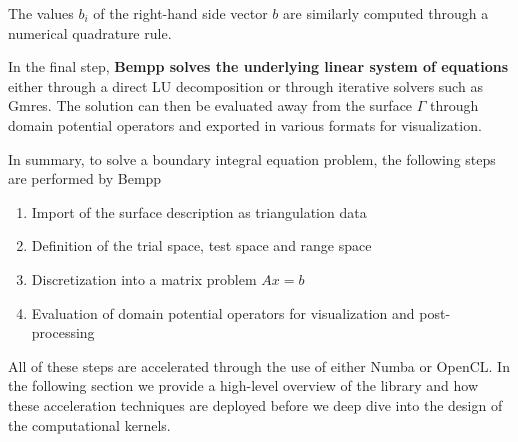 The values $b_i$ of the right-hand side vector $b$ are similarly computed through a numerical quadrature rule.

In the final step, \textbf{Bempp solves the underlying linear system of equations} either through a direct LU decomposition or through iterative solvers such as Gmres. The solution can then be evaluated away from the surface $\Gamma$ through domain potential operators and exported in various formats for visualization.

In summary, to solve a boundary integral equation problem, the following steps are performed by Bempp
\begin{enumerate}
	\item Import of the surface description as triangulation data
	\item Definition of the trial space, test space and range space
	\item Discretization into a matrix problem $Ax=b$
	\item Evaluation of domain potential operators for visualization and post-processing
\end{enumerate}

All of these steps are accelerated through the use of either Numba or OpenCL. In the following section we provide a high-level overview of the library and how these acceleration techniques are deployed before we deep dive into the design of the computational kernels.
